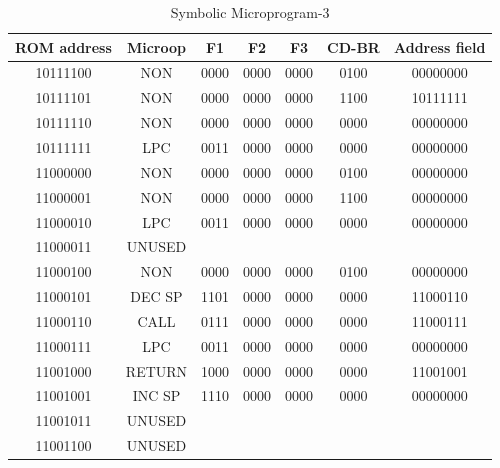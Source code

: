 \documentclass[pdftex,12pt,a4paper]{article}
\begin{document}
\begin{table}[h]
    \centering
    \begin{tabular}{|c|c|c|c|c|c|c|}
    \hline
    ROM address	&Microop&	F1&	F2&	F3&	CD-BR&		Address field \\\hline
10111100 &	NON     &  0000 &		0000 &		0000 &		0100	 &		00000000 \\\hline
10111101 &	NON     &  0000 &		0000 &		0000 &		1100	 &		10111111\\\hline
10111110 &	NON     &  0000 &		0000 &		0000 &		0000	 &		00000000\\\hline
10111111 &	LPC     &  0011 &		0000 &		0000 &		0000	 &		00000000\\\hline
11000000 &	NON     &  0000 &		0000 &		0000 &		0100	 &		00000000 \\\hline
11000001 &	NON     &  0000 &		0000 &		0000 &		1100	 &		00000000\\\hline
11000010 &	LPC     &  0011 &		0000 &		0000 &		0000	 &		00000000\\\hline
11000011 &	UNUSED  &&&&&\\\hline
11000100 &	NON     &  0000 &		0000 &		0000 &		0100	 &		00000000\\\hline
11000101 &	DEC SP	&	1101 &		0000 &		0000 &		0000	 &		11000110\\\hline
11000110 &	CALL	&	0111 &		0000 &		0000 &		0000	 &		11000111\\\hline
11000111 &	LPC		&  0011 &		0000 &		0000 &		0000	 &		00000000\\\hline
11001000 &	RETURN	&  1000 &		0000 &		0000 &		0000	 &		11001001\\\hline
11001001 &	INC SP	&	1110 &		0000 &		0000 &		0000	 &		00000000\\\hline
11001011 &	UNUSED  &&&&&\\\hline
11001100 &	UNUSED  &&&&&\\\hline


   \end{tabular}
    \caption{Symbolic Microprogram-3}
    \label{mp3}
\end{table}
\end{document}

